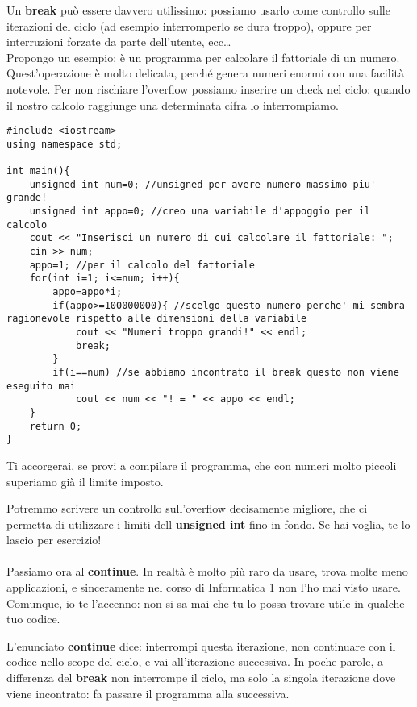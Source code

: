 	Un \textbf{break} può essere davvero utilissimo: possiamo usarlo come controllo sulle iterazioni del ciclo (ad esempio interromperlo se dura troppo), oppure per interruzioni forzate da parte dell'utente, ecc\ldots \\
	
	Propongo un esempio: è un programma per calcolare il fattoriale di un numero. Quest'operazione è molto delicata, perché genera numeri enormi con una facilità notevole. Per non rischiare l'overflow possiamo inserire un check nel ciclo: quando il nostro calcolo raggiunge una determinata cifra lo interrompiamo.
	\begin{lstlisting}
#include <iostream>
using namespace std;

int main(){
	unsigned int num=0; //unsigned per avere numero massimo piu' grande!
	unsigned int appo=0; //creo una variabile d'appoggio per il calcolo
	cout << "Inserisci un numero di cui calcolare il fattoriale: ";
	cin >> num;
	appo=1; //per il calcolo del fattoriale
	for(int i=1; i<=num; i++){
		appo=appo*i;
		if(appo>=100000000){ //scelgo questo numero perche' mi sembra ragionevole rispetto alle dimensioni della variabile
			cout << "Numeri troppo grandi!" << endl;
			break;
		}
		if(i==num) //se abbiamo incontrato il break questo non viene eseguito mai
			cout << num << "! = " << appo << endl;
	}
	return 0;
}
	\end{lstlisting}
	Ti accorgerai, se provi a compilare il programma, che con numeri molto piccoli superiamo già il limite imposto.
	
	Potremmo scrivere un controllo sull'overflow decisamente migliore, che ci permetta di utilizzare i limiti dell \textbf{unsigned int} fino in fondo. Se hai voglia, te lo lascio per esercizio!\\ \\
	
	
	Passiamo ora al \textbf{continue}. In realtà è molto più raro da usare, trova molte meno applicazioni, e sinceramente nel corso di Informatica 1 non l'ho mai visto usare. Comunque, io te l'accenno: non si sa mai che tu lo possa trovare utile in qualche tuo codice.
	
	L'enunciato \textbf{continue} dice: interrompi questa iterazione, non continuare con il codice nello scope del ciclo, e vai all'iterazione successiva. In poche parole, a differenza del \textbf{break} non interrompe il ciclo, ma solo la singola iterazione dove viene incontrato: fa passare il programma alla successiva.
	
